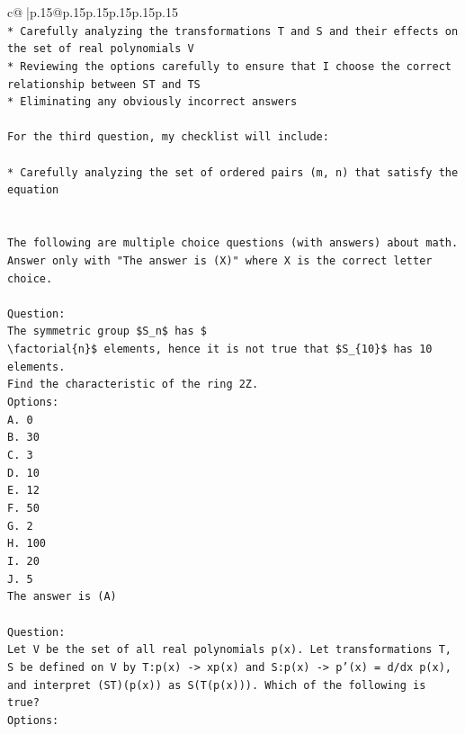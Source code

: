 \documentclass{article}
\begin{document}
{\begin{supertabular}{c@{$\;$}|p{.15\linewidth}@{}p{.15\linewidth}p{.15\linewidth}p{.15\linewidth}p{.15\linewidth}p{.15\linewidth}}
{{{\\ 
\texttt{* Carefully analyzing the transformations T and S and their effects on the set of real polynomials V} \\
\texttt{* Reviewing the options carefully to ensure that I choose the correct relationship between ST and TS} \\
\texttt{* Eliminating any obviously incorrect answers} \\
\\ 
\texttt{For the third question, my checklist will include:} \\
\\ 
\texttt{* Carefully analyzing the set of ordered pairs (m, n) that satisfy the equation} \\
\\ 
\\ 
\texttt{The following are multiple choice questions (with answers) about math. Answer only with "The answer is (X)" where X is the correct letter choice.} \\
\\ 
\texttt{Question:} \\
\texttt{The symmetric group \$S\_n\$ has \$} \\
\texttt{\textbackslash{}factorial\{n\}\$ elements, hence it is not true that \$S\_\{10\}\$ has 10 elements.} \\
\texttt{Find the characteristic of the ring 2Z.} \\
\texttt{Options:} \\
\texttt{A. 0} \\
\texttt{B. 30} \\
\texttt{C. 3} \\
\texttt{D. 10} \\
\texttt{E. 12} \\
\texttt{F. 50} \\
\texttt{G. 2} \\
\texttt{H. 100} \\
\texttt{I. 20} \\
\texttt{J. 5} \\
\texttt{The answer is (A)} \\
\\ 
\texttt{Question:} \\
\texttt{Let V be the set of all real polynomials p(x). Let transformations T, S be defined on V by T:p(x) {-}> xp(x) and S:p(x) {-}> p'(x) = d/dx p(x), and interpret (ST)(p(x)) as S(T(p(x))). Which of the following is true?} \\
\texttt{Options:} \\
}}}
\end{supertabular}}
\end{document}
